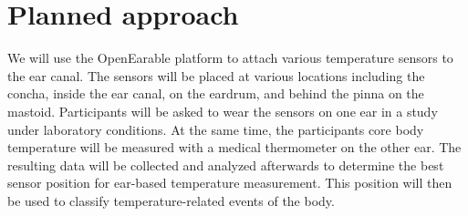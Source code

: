 


\section{Planned approach}
We will use the OpenEarable platform to attach various temperature sensors to the ear canal. The sensors will be placed at various locations including the concha, inside the ear canal, on the eardrum, and behind the pinna on the mastoid. Participants will be asked to wear the sensors on one ear in a study under laboratory conditions.
At the same time, the participants core body temperature will be measured with a medical thermometer on the other ear.
The resulting data will be collected and analyzed afterwards to determine the best sensor position for ear-based temperature measurement. This position will then be used to classify temperature-related events of the body.



